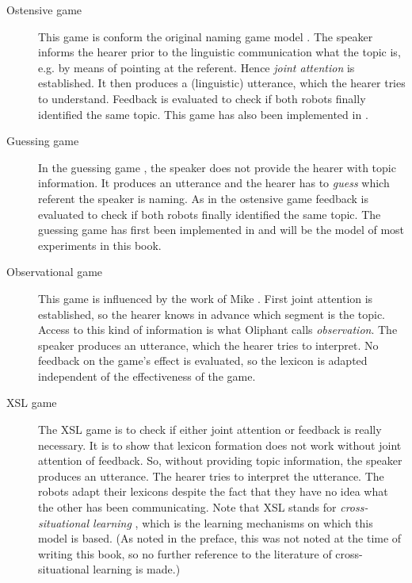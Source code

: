 \begin{description}
\item[Ostensive game] This game is conform the original naming game model \citep{steels:1996a}. The speaker informs the hearer prior to the linguistic communication what the topic is, e.g. by means of pointing at the referent. Hence {\em joint attention} is established. It then produces a (linguistic) utterance, which the hearer tries to understand. Feedback is evaluated to check if both robots finally identified the same topic. This game has also been implemented in \citep{steelsvogt:1997}.

\item[Guessing game] In the guessing game \citep{steelskaplan:1999}, the speaker does not provide the hearer with topic information. It produces an utterance and the hearer has to {\em guess} which referent the speaker is naming. As in the ostensive game feedback is evaluated to check if both robots finally identified the same topic. The guessing game has first been implemented in \citep{vogt:1998c} and will be the model of most experiments in this book.

\item[Observational game] This game is influenced by the work of Mike \citet{oliphant:1997}. First joint attention is established, so the hearer knows in advance which segment is the topic. Access to this kind of information is what Oliphant calls {\em observation}. The speaker produces an utterance, which the hearer tries to interpret. No feedback on the game's effect is evaluated, so the lexicon is adapted independent of the effectiveness of the game.

\item[XSL game] The XSL game is to check if either joint attention or feedback is really necessary. It is to show that lexicon formation does not work without joint attention of feedback. So, without providing topic information, the speaker produces an utterance. The hearer tries to interpret the utterance. The robots adapt their lexicons despite the fact that they have no idea what the other has been communicating. Note that XSL stands for {\em cross-situational learning} \citep{pinker:1989,siskind:1996}, which is the learning mechanisms on which this model is based. (As noted in the preface, this was not noted at the time of writing this book, so no further reference to the literature of cross-situational learning is made.)

\end{description}

